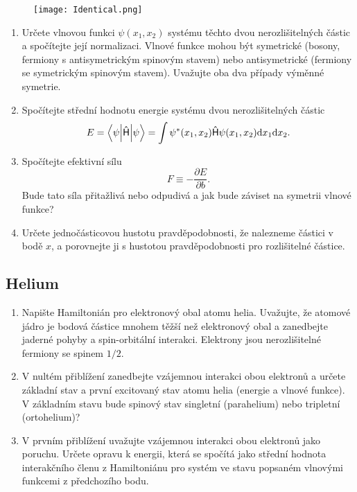         \begin{figure}[htbp!]
            \centering
            \texttt{[image: Identical.png]}
        \end{figure}

        \begin{enumerate}
            \item 
                Určete vlnovou funkci $\psi(x_{1},x_{2})$ systému těchto dvou nerozlišitelných částic a spočítejte její normalizaci.
                Vlnové funkce mohou být symetrické (bosony, fermiony s antisymetrickým spinovým stavem) nebo antisymetrické (fermiony se symetrickým spinovým stavem). 
                Uvažujte oba dva případy výměnné symetrie.
            
            \item Spočítejte střední hodnotu energie systému dvou nerozlišitelných částic
                \begin{equation}
                    E=\left\langle{\psi}\middle|{\mathsf{\hat{H}}}\middle|{\psi}\right\rangle=\int\psi^{*}(x_{1},x_{2})\mathsf{\hat{H}}\psi(x_{1},x_{2})\mathrm{d} x_{1}\mathrm{d} x_{2}.
                \end{equation}

            \item Spočítejte efektivní sílu
                \begin{equation}
                    F\equiv-\frac{\partial E}{\partial b}.
                \end{equation}
                Bude tato síla přitažlivá nebo odpudivá a jak bude záviset na symetrii vlnové funkce?

            \item Určete jednočásticovou hustotu pravděpodobnosti, že nalezneme částici v bodě $x$, a porovnejte ji s hustotou pravděpodobnosti pro rozlišitelné částice.
        \end{enumerate}

\subsection{Helium}
    \begin{enumerate}
        \item
            Napište Hamiltonián pro elektronový obal atomu helia.
            Uvažujte, že atomové jádro je bodová částice mnohem těžší než elektronový obal a zanedbejte jaderné pohyby a spin-orbitální interakci.
            Elektrony jsou nerozlišitelné fermiony se spinem $1/2$.

        \item
            V nultém přiblížení zanedbejte vzájemnou interakci obou elektronů a určete základní stav a první excitovaný stav atomu helia (energie a vlnové funkce).
            V základním stavu bude spinový stav singletní (parahelium) nebo tripletní (ortohelium)?

        \item
            V prvním přiblížení uvažujte vzájemnou interakci obou elektronů jako poruchu.
            Určete opravu k energii, která se spočítá jako střední hodnota interakčního členu z Hamiltoniánu pro systém ve stavu popsaném vlnovými funkcemi z předchozího bodu.
    \end{enumerate}

